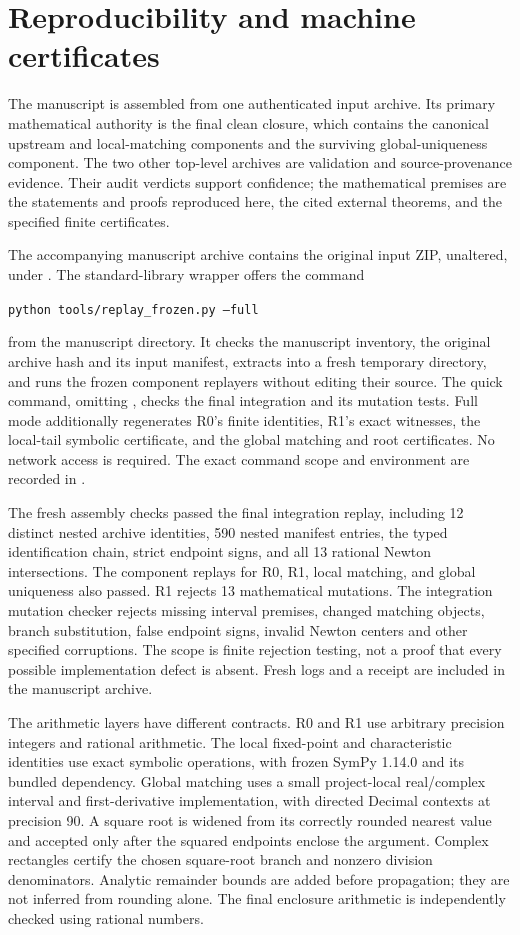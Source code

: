 \section{Reproducibility and machine certificates}\label{sec:reproducibility}
The manuscript is assembled from one authenticated input archive. Its
primary mathematical authority is the final clean closure, which contains
the canonical upstream and local-matching components and the surviving
global-uniqueness component. The two other top-level archives are validation
and source-provenance evidence. Their audit verdicts support confidence;
the mathematical premises are the statements and proofs reproduced here,
the cited external theorems, and the specified finite certificates.

The accompanying manuscript archive contains the original input ZIP,
unaltered, under . The standard-library wrapper
 offers the command
\begin{center}
\texttt{python tools/replay\_frozen.py --full}
\end{center}
from the manuscript directory. It checks the manuscript inventory, the
original archive hash and its input manifest, extracts into a fresh temporary
directory, and runs the frozen component replayers without editing their
source. The quick command, omitting , checks the final integration
and its mutation tests. Full mode additionally regenerates R0's finite
identities, R1's exact witnesses, the local-tail symbolic certificate, and
the global matching and root certificates. No network access is required.
The exact command scope and environment are recorded in
.

The fresh assembly checks passed the final integration replay, including
12 distinct nested archive identities, 590 nested manifest entries, the
typed identification chain, strict endpoint signs, and all 13 rational
Newton intersections. The component replays for R0, R1, local matching,
and global uniqueness also passed. R1 rejects 13 mathematical mutations.
The integration mutation checker rejects missing interval premises, changed
matching objects, branch substitution, false endpoint signs, invalid Newton
centers and other specified corruptions. The scope is finite rejection
testing, not a proof that every possible implementation defect is absent.
Fresh logs and a receipt are included in the manuscript archive.

The arithmetic layers have different contracts. R0 and R1 use arbitrary
precision integers and rational arithmetic. The local fixed-point and
characteristic identities use exact symbolic operations, with frozen
SymPy 1.14.0 and its bundled dependency. Global matching uses a small
project-local real/complex interval and first-derivative implementation,
with directed Decimal contexts at precision 90. A square root is widened
from its correctly rounded nearest value and accepted only after the
squared endpoints enclose the argument. Complex rectangles certify the
chosen square-root branch and nonzero division denominators. Analytic
remainder bounds are added before propagation; they are not inferred from
rounding alone. The final enclosure arithmetic is independently checked
using rational numbers.

